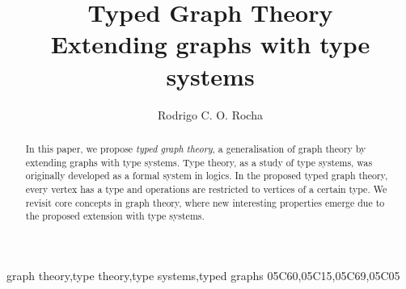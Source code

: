 \documentclass[preprint,12pt]{elsarticle}
\theoremstyle{plain}
\begin{document}
\begin{frontmatter}


\title{Typed Graph Theory\\Extending graphs with type systems}





\author{Rodrigo C. O. Rocha}
\address{School of Informatics\\University of Edinburgh\\Scotland, UK\\r.rocha@ed.ac.uk}

\begin{abstract}
In this paper, we propose \textit{typed graph theory},
a generalisation of graph theory by extending
graphs with type systems.
Type theory, as a study of type systems,
was originally developed as a formal system in logics.
In the proposed typed graph theory, every vertex has a type
and operations are restricted to vertices of a certain type.
We revisit core concepts in graph theory, where
new interesting properties emerge due to the proposed
extension with type systems.
\end{abstract}

\begin{keyword}
graph theory\sep type theory\sep type systems\sep typed graphs
\MSC[2010] 05C60\sep 05C15\sep 05C69\sep 05C05
\end{keyword}

\end{frontmatter}
\end{document}
